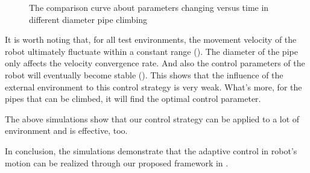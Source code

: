 \begin{figure}[!t]
{	}
	\caption{The comparison curve about parameters changing versus time in different diameter pipe climbing}
\end{figure}

It is worth noting that, for all test environments, the movement velocity of the robot  ultimately fluctuate within a constant range  (). The diameter of the pipe only affects the velocity convergence rate. And also the control parameters of the robot will eventually become stable (). This shows that the influence of the external environment to this control strategy is very weak. What's more, for the pipes that can be climbed, it will find the optimal control parameter.

The above simulations show that our control strategy can be applied to a lot of environment and is effective, too.

In conclusion, the simulations demonstrate that the adaptive control in robot's motion can be realized through our proposed framework in .

